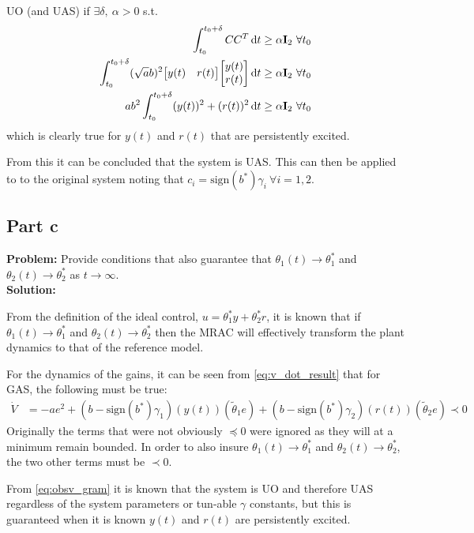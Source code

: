 \documentclass[letter]{article}
\begin{document}
UO (and UAS) if $\exists \delta, \ \alpha > 0$ s.t.
\begin{align}
	\int_{t_0}^{t_0+\delta} C C^T \dd{t}
	&\geq \alpha \vb{I}_2 \ \forall t_0\\
	\int_{t_0}^{t_0+\delta} (\sqrt{a} b)^2 \mqty[y(t) & r(t)] \mqty[y(t) \\ r(t)]  \dd{t}
	&\geq \alpha \vb{I}_2 \ \forall t_0\\
	a b^2 \int_{t_0}^{t_0+\delta} (y(t))^2 + (r(t))^2 \dd{t}
	&\geq \alpha \vb{I}_2 \ \forall t_0\label{eq:obsv_gram}
\end{align}
which is clearly true for $y(t)$ and $r(t)$ that are persistently excited.

From this it can be concluded that the system is UAS. This can then be applied to to the original system noting that $c_i = \text{sign}(b^*) \gamma_i \ \forall i = 1,2$.


\newpage
\subsection{Part c}
\textbf{Problem:}
Provide conditions that also guarantee that $\theta_1(t) \to \theta_1^*$ and $\theta_2(t) \to \theta_2^*$ as $t\to\infty$.\\

\noindent
\textbf{Solution:}

From the definition of the ideal control, $u = \theta_1^* y + \theta_2^* r$, it is known that if $\theta_1(t) \to \theta_1^*$ and $\theta_2(t) \to \theta_2^*$ then the MRAC will effectively transform the plant dynamics to that of the reference model.

For the dynamics of the gains, it can be seen from \eqref{eq:v_dot_result} that for GAS, the following must be true:
\begin{align}
	\dot{V} &= -a e^2 + (b-\text{sign}(b^*) \gamma_1) (y(t)) (\tilde{\theta}_1 e) + (b - \text{sign}(b^*) \gamma_2) (r(t)) (\tilde{\theta}_2 e) \prec 0
\end{align}
Originally the terms that were not obviously $\preceq 0$ were ignored as they will at a minimum remain bounded. In order to also insure $\theta_1(t) \to \theta_1^*$ and $\theta_2(t) \to \theta_2^*$, the two other terms must be $\prec 0$.

From \eqref{eq:obsv_gram} it is known that the system is UO and therefore UAS regardless of the system parameters or tun-able $\gamma$ constants, but this is guaranteed when it is known $y(t)$ and $r(t)$ are persistently excited.
\end{document}
